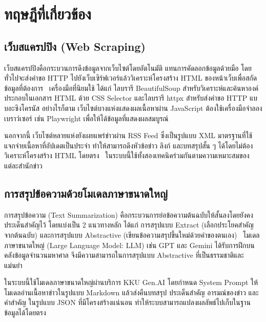 
\section{ทฤษฎีที่เกี่ยวข้อง}

\subsection{เว็บสแครปปิง (Web Scraping)}

เว็บสแครปปิงคือกระบวนการดึงข้อมูลจากเว็บไซต์โดยอัตโนมัติ แทนการคัดลอกข้อมูลด้วยมือ โดยทั่วไปจะส่งคำขอ HTTP ไปยังเว็บเซิร์ฟเวอร์แล้ววิเคราะห์โครงสร้าง HTML ของหน้าเว็บเพื่อสกัดข้อมูลที่ต้องการ~\cite{trafilatura2021} เครื่องมือที่นิยมใช้ ได้แก่ ไลบรารี BeautifulSoup สำหรับวิเคราะห์และค้นหาองค์ประกอบในเอกสาร HTML ด้วย CSS Selector และไลบรารี httpx สำหรับส่งคำขอ HTTP แบบอะซิงโครนัส อย่างไรก็ตาม เว็บไซต์บางแห่งแสดงผลเนื้อหาผ่าน JavaScript ต้องใช้เครื่องมือจำลองเบราว์เซอร์ เช่น Playwright เพื่อให้ได้ข้อมูลที่แสดงผลสมบูรณ์

นอกจากนี้ เว็บไซต์หลายแห่งยังเผยแพร่ข่าวผ่าน RSS Feed ซึ่งเป็นรูปแบบ XML มาตรฐานที่ใช้แจกจ่ายเนื้อหาที่อัปเดตเป็นประจำ ทำให้สามารถดึงหัวข้อข่าว ลิงก์ และบทสรุปสั้น ๆ ได้โดยไม่ต้องวิเคราะห์โครงสร้าง HTML โดยตรง~\cite{rss2009} ในระบบนี้ใช้ทั้งสองเทคนิคร่วมกันตามความเหมาะสมของแต่ละสำนักข่าว

\subsection{การสรุปข้อความด้วยโมเดลภาษาขนาดใหญ่}

การสรุปข้อความ (Text Summarization) คือกระบวนการย่อข้อความต้นฉบับให้สั้นลงโดยยังคงประเด็นสำคัญไว้ โดยแบ่งเป็น 2 แนวทางหลัก ได้แก่ การสรุปแบบ Extract (เลือกประโยคสำคัญจากต้นฉบับ) และการสรุปแบบ Abstractive (เขียนข้อความสรุปขึ้นใหม่ด้วยคำของตนเอง)~\cite{allahyari2017} โมเดลภาษาขนาดใหญ่ (Large Language Model: LLM) เช่น GPT และ Gemini ได้รับการฝึกบนคลังข้อมูลจำนวนมหาศาล จึงมีความสามารถในการสรุปแบบ Abstractive ที่เป็นธรรมชาติและแม่นยำ~\cite{gemini2024}

ในระบบนี้ใช้โมเดลภาษาขนาดใหญ่ผ่านบริการ KKU Gen.AI โดยกำหนด System Prompt ให้โมเดลอ่านเนื้อหาข่าวในรูปแบบ Markdown แล้วส่งคืนบทสรุป ประเด็นสำคัญ อารมณ์ของข่าว และคำสำคัญ ในรูปแบบ JSON ที่มีโครงสร้างแน่นอน ทำให้ระบบสามารถแปลงผลลัพธ์ไปเก็บในฐานข้อมูลได้โดยตรง~\cite{openai2024}

